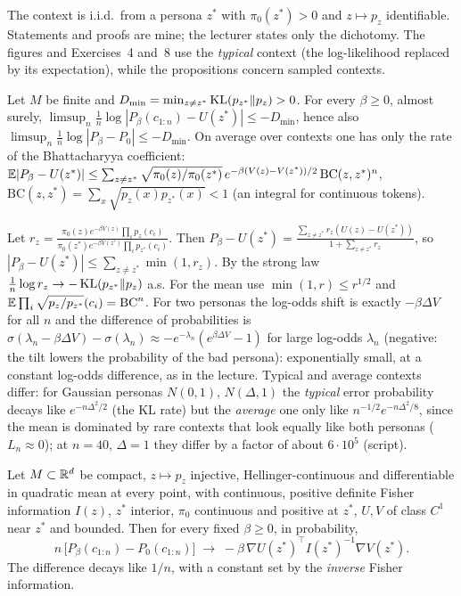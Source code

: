\begin{beyond}\label{box:L7-pred}
The context is i.i.d.\ from a persona $z^*$ with $\pi_0(z^*)>0$ and $z\mapsto p_z$ identifiable. Statements and proofs are mine; the lecturer states only the dichotomy. The figures and Exercises~4 and~8 use the \emph{typical} context (the log-likelihood replaced by its expectation), while the propositions concern sampled contexts.

\label{prop:L7-disc}
Let $M$ be finite and $D_{\min}=\min_{z\ne z^*}\operatorname{KL}(p_{z^*}\|p_z)>0$. For every $\beta\ge0$, almost surely, $\limsup_n\frac1n\log|P_\beta(c_{1:n})-U(z^*)|\le-D_{\min}$, hence also $\limsup_n\frac1n\log|P_\beta-P_0|\le-D_{\min}$. On average over contexts one has only the rate of the Bhattacharyya coefficient: $\mathbb{E}|P_\beta-U(z^*)|\le\sum_{z\ne z^*}\sqrt{\pi_0(z)/\pi_0(z^*)}\,e^{-\beta(V(z)-V(z^*))/2}\,\mathrm{BC}(z,z^*)^n$, $\mathrm{BC}(z,z^*)=\sum_x\sqrt{p_z(x)p_{z^*}(x)}<1$ (an integral for continuous tokens).

\LVIIproof Let $r_z=\frac{\pi_0(z)e^{-\beta V(z)}\prod_ip_z(c_i)}{\pi_0(z^*)e^{-\beta V(z^*)}\prod_ip_{z^*}(c_i)}$. Then $P_\beta-U(z^*)=\frac{\sum_{z\ne z^*}r_z(U(z)-U(z^*))}{1+\sum_{z\ne z^*}r_z}$, so $|P_\beta-U(z^*)|\le\sum_{z\ne z^*}\min(1,r_z)$. By the strong law $\frac1n\log r_z\to-\operatorname{KL}(p_{z^*}\|p_z)$ a.s. For the mean use $\min(1,r)\le r^{1/2}$ and $\mathbb{E}\prod_i\sqrt{p_z/p_{z^*}}(c_i)=\mathrm{BC}^n$. \LVIIqed
For two personas the log-odds shift is exactly $-\beta\Delta V$ for all $n$ and the difference of probabilities is $\sigma(\lambda_n-\beta\Delta V)-\sigma(\lambda_n)\approx-e^{-\lambda_n}(e^{\beta\Delta V}-1)$ for large log-odds $\lambda_n$ (negative: the tilt lowers the probability of the bad persona): exponentially small, at a constant log-odds difference, as in the lecture. Typical and average contexts differ: for Gaussian personas $N(0,1)$, $N(\Delta,1)$ the \emph{typical} error probability decays like $e^{-n\Delta^2/2}$ (the KL rate) but the \emph{average} one only like $n^{-1/2}e^{-n\Delta^2/8}$, since the mean is dominated by rare contexts that look equally like both personas ($L_n\approx0$); at $n=40$, $\Delta=1$ they differ by a factor of about $6\cdot10^5$ (script).

\label{prop:L7-manifold}
Let $M\subset\mathbb{R}^d$ be compact, $z\mapsto p_z$ injective, Hellinger-continuous and differentiable in quadratic mean at every point, with continuous, positive definite Fisher information $I(z)$, $z^*$ interior, $\pi_0$ continuous and positive at $z^*$, $U,V$ of class $C^1$ near $z^*$ and bounded. Then for every fixed $\beta\ge0$, in probability,
\begin{equation}\label{eq:L7-manifold}
   n\,\big[P_\beta(c_{1:n})-P_0(c_{1:n})\big]\;\longrightarrow\;-\beta\,\nabla U(z^*)^{\!\top}I(z^*)^{-1}\nabla V(z^*).
\end{equation}
The difference decays like $1/n$, with a constant set by the \emph{inverse} Fisher information.


\end{beyond}
